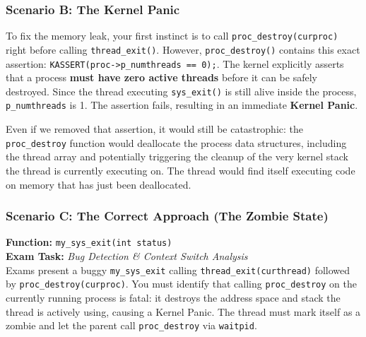\subsubsection*{Scenario B: The Kernel Panic}
To fix the memory leak, your first instinct is to call \texttt{proc\_destroy(curproc)} right before calling \texttt{thread\_exit()}. 
However, \texttt{proc\_destroy()} contains this exact assertion: \texttt{KASSERT(proc->p\_numthreads == 0);}.
The kernel explicitly asserts that a process \textbf{must have zero active threads} before it can be safely destroyed. Since the thread executing \texttt{sys\_exit()} is still alive inside the process, \texttt{p\_numthreads} is 1. The assertion fails, resulting in an immediate \textbf{Kernel Panic}.

Even if we removed that assertion, it would still be catastrophic: the \texttt{proc\_destroy} function would deallocate the process data structures, including the thread array and potentially triggering the cleanup of the very kernel stack the thread is currently executing on. The thread would find itself executing code on memory that has just been deallocated.

\subsubsection*{Scenario C: The Correct Approach (The Zombie State)}

\begin{tcolorbox}[colback=red!5!white, colframe=red!75!black, title=\textbf{! EXAM FOCUS: IMPLEMENTATION REQUIRED}]
\textbf{Function:} \texttt{my\_sys\_exit(int status)} \\
\textbf{Exam Task:} \textit{Bug Detection \& Context Switch Analysis} \\
Exams present a buggy \texttt{my\_sys\_exit} calling \texttt{thread\_exit(curthread)} followed by \texttt{proc\_destroy(curproc)}. You must identify that calling \texttt{proc\_destroy} on the currently running process is fatal: it destroys the address space and stack the thread is actively using, causing a Kernel Panic. The thread must mark itself as a zombie and let the parent call \texttt{proc\_destroy} via \texttt{waitpid}.
\end{tcolorbox}

